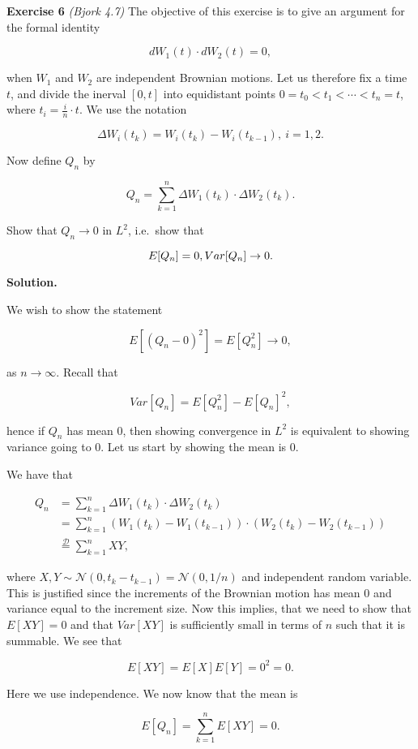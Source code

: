 \documentclass[
]{article}
\begin{document}
\textbf{Exercise 6} \emph{(Bjork 4.7)} The objective of this exercise is
to give an argument for the formal identity

\[
dW_1(t)\cdot dW_2(t)=0,
\]

when \(W_1\) and \(W_2\) are independent Brownian motions. Let us
therefore fix a time \(t\), and divide the inerval \([0,t]\) into
equidistant points \(0=t_0<t_1<\cdots < t_n=t\), where
\(t_i=\frac{i}{n}\cdot t\). We use the notation

\[
\Delta W_i(t_k)=W_i(t_k)-W_i(t_{k-1}),\ i=1,2.
\]

Now define \(Q_n\) by

\[
Q_n=\sum_{k=1}^n \Delta W_1(t_k)\cdot \Delta W_2(t_k).
\]

Show that \(Q_n\to 0\) in \(L^2\), i.e.~show that

\[
E[Q_n]=0,\\
Var[Q_n]\to 0.
\]

\textbf{Solution.}

We wish to show the statement

\[
E[(Q_n-0)^2]=E[Q_n^2]\to 0,
\]

as \(n\to \infty\). Recall that

\[
Var[Q_n]=E[Q_n^2]-E[Q_n]^2,
\]

hence if \(Q_n\) has mean 0, then showing convergence in \(L^2\) is
equivalent to showing variance going to 0. Let us start by showing the
mean is 0.

We have that

\begin{align*}
Q_n&=\sum_{k=1}^n \Delta W_1(t_k)\cdot \Delta W_2(t_k)\\
&=\sum_{k=1}^n(W_1(t_k)-W_1(t_{k-1}))\cdot (W_2(t_k)-W_2(t_{k-1}))\\
&\stackrel{\mathcal{D}}{=}\sum_{k=1}^nXY,
\end{align*}

where \(X,Y\sim\mathcal{N}(0,t_k-t_{k-1})=\mathcal{N}(0,1/n)\) and
independent random variable. This is justified since the increments of
the Brownian motion has mean 0 and variance equal to the increment size.
Now this implies, that we need to show that \(E[XY]=0\) and that
\(Var[XY]\) is sufficiently small in terms of \(n\) such that it is
summable. We see that

\[
E[XY]=E[X]E[Y]=0^2=0.
\]

Here we use independence. We now know that the mean is

\[
E[Q_n]=\sum_{k=1}^nE[XY]=0.
\]
\end{document}
